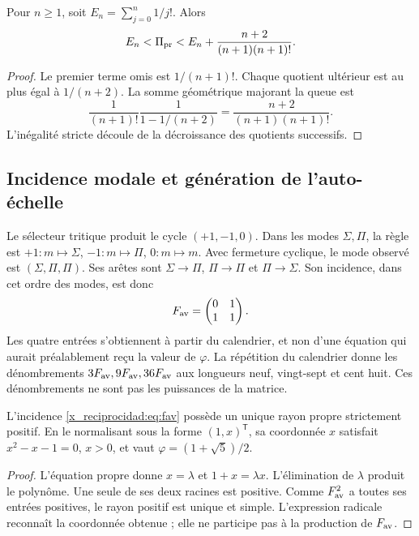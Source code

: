 \begin{proposition}
Pour \(n\ge1\), soit \(E_n=\sum_{j=0}^n1/j!\). Alors
\[
 E_n<\Pi_{\rm pr}<E_n+\frac{n+2}{(n+1)(n+1)!}.
\]
\end{proposition}
\begin{proof}
Le premier terme omis est \(1/(n+1)!\). Chaque quotient ultérieur est au plus égal à \(1/(n+2)\). La somme géométrique majorant la queue est
\[
 \frac1{(n+1)!}\frac1{1-1/(n+2)}
 =\frac{n+2}{(n+1)(n+1)!}.
\]
L'inégalité stricte découle de la décroissance des quotients successifs.
\end{proof}

\subsection{Incidence modale et génération de l'auto-échelle}

Le sélecteur tritique produit le cycle \((+1,-1,0)\). Dans les modes \(\Sigma,\Pi\), la règle est \(+1:m\mapsto\Sigma\), \(-1:m\mapsto\Pi\), \(0:m\mapsto m\). Avec fermeture cyclique, le mode observé est \((\Sigma,\Pi,\Pi)\). Ses arêtes sont \(\Sigma\to\Pi\), \(\Pi\to\Pi\) et \(\Pi\to\Sigma\). Son incidence, dans cet ordre des modes, est donc
\begin{equation}
 F_{\rm av}=\begin{pmatrix}0&1\\1&1\end{pmatrix}.
 \label{x_reciprocidad:eq:fav}
\end{equation}
Les quatre entrées s'obtiennent à partir du calendrier, et non d'une équation qui aurait préalablement reçu la valeur de \(\varphi\). La répétition du calendrier donne les dénombrements \(3F_{\rm av},9F_{\rm av},36F_{\rm av}\) aux longueurs neuf, vingt-sept et cent huit. Ces dénombrements ne sont pas les puissances de la matrice.

\begin{theorem}
L'incidence \eqref{x_reciprocidad:eq:fav} possède un unique rayon propre strictement positif. En le normalisant sous la forme \((1,x)^{\mathsf T}\), sa coordonnée \(x\) satisfait \(x^2-x-1=0\), \(x>0\), et vaut \(\varphi=(1+\sqrt5)/2\).
\end{theorem}
\begin{proof}
L'équation propre donne \(x=\lambda\) et \(1+x=\lambda x\). L'élimination de \(\lambda\) produit le polynôme. Une seule de ses deux racines est positive. Comme \(F_{\rm av}^2\) a toutes ses entrées positives, le rayon positif est unique et simple. L'expression radicale reconnaît la coordonnée obtenue ; elle ne participe pas à la production de \(F_{\rm av}\).
\end{proof}

